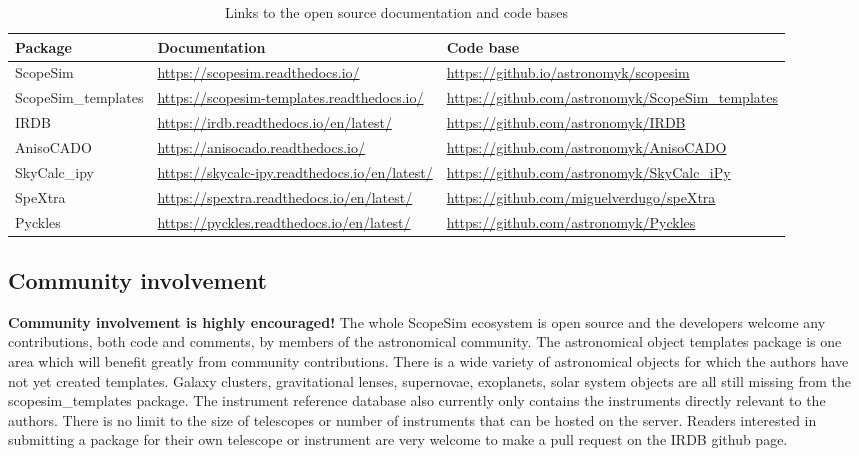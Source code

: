 \setlength{\DUtablewidth}{\linewidth}
\begin{longtable}[c]{|p{0.315\DUtablewidth}|p{0.315\DUtablewidth}|p{0.315\DUtablewidth}|}
\caption{Links to the open source documentation and code bases}\\
\hline

Package
 & 
Documentation
 & 
Code base
 \\
\hline

ScopeSim
 & 
\url{https://scopesim.readthedocs.io/}
 & 
\url{https://github.io/astronomyk/scopesim}
 \\
\hline

ScopeSim\_templates
 & 
\url{https://scopesim-templates.readthedocs.io/}
 & 
\url{https://github.com/astronomyk/ScopeSim_templates}
 \\
\hline

IRDB
 & 
\url{https://irdb.readthedocs.io/en/latest/}
 & 
\url{https://github.com/astronomyk/IRDB}
 \\
\hline

AnisoCADO
 & 
\url{https://anisocado.readthedocs.io/}
 & 
\url{https://github.com/astronomyk/AnisoCADO}
 \\
\hline

SkyCalc\_ipy
 & 
\url{https://skycalc-ipy.readthedocs.io/en/latest/}
 & 
\url{https://github.com/astronomyk/SkyCalc_iPy}
 \\
\hline

SpeXtra
 & 
\url{https://spextra.readthedocs.io/en/latest/}
 & 
\url{https://github.com/miguelverdugo/speXtra}
 \\
\hline

Pyckles
 & 
\url{https://pyckles.readthedocs.io/en/latest/}
 & 
\url{https://github.com/astronomyk/Pyckles}
 \\
\hline
\end{longtable}
\label{tbl-list-of-packages}


\subsection{Community involvement%
  \label{community-involvement}%
}

\textbf{Community involvement is highly encouraged!}
The whole ScopeSim ecosystem is open source and the developers welcome any contributions, both code and comments, by members of the astronomical community.
The astronomical object templates package is one area which will benefit greatly from community contributions.
There is a wide variety of astronomical objects for which the authors have not yet created templates.
Galaxy clusters, gravitational lenses, supernovae, exoplanets, solar system objects are all still missing from the scopesim\_templates package.
The instrument reference database also currently only contains the instruments directly relevant to the authors.
There is no limit to the size of telescopes or number of instruments that can be hosted on the server.
Readers interested in submitting a package for their own telescope or instrument are very welcome to make a pull request on the IRDB github page.
